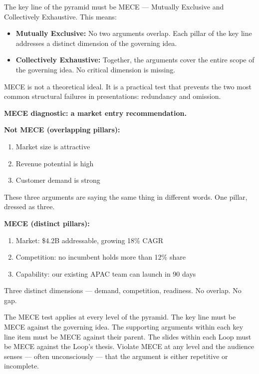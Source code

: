 The key line of the pyramid must be MECE --- Mutually Exclusive and Collectively Exhaustive. This means:

\begin{itemize}
  \item \textbf{Mutually Exclusive:} No two arguments overlap. Each pillar of the key line addresses a distinct dimension of the governing idea.
  \item \textbf{Collectively Exhaustive:} Together, the arguments cover the entire scope of the governing idea. No critical dimension is missing.
\end{itemize}

MECE is not a theoretical ideal. It is a practical test that prevents the two most common structural failures in presentations: redundancy and omission.

\begin{diagnosisbox}
\textbf{MECE diagnostic: a market entry recommendation.}

\vspace{6pt}
\textbf{Not MECE (overlapping pillars):}
\begin{enumerate}[leftmargin=2em]
  \item Market size is attractive
  \item Revenue potential is high
  \item Customer demand is strong
\end{enumerate}
{\small\color{signalred} These three arguments are saying the same thing in different words. One pillar, dressed as three.}

\vspace{6pt}
\textbf{MECE (distinct pillars):}
\begin{enumerate}[leftmargin=2em]
  \item Market: \$4.2B addressable, growing 18\% CAGR
  \item Competition: no incumbent holds more than 12\% share
  \item Capability: our existing APAC team can launch in 90 days
\end{enumerate}
{\small\color{techteal} Three distinct dimensions --- demand, competition, readiness. No overlap. No gap.}
\end{diagnosisbox}

The MECE test applies at every level of the pyramid. The key line must be MECE against the governing idea. The supporting arguments within each key line item must be MECE against their parent. The slides within each Loop must be MECE against the Loop's thesis. Violate MECE at any level and the audience senses --- often unconsciously --- that the argument is either repetitive or incomplete.


